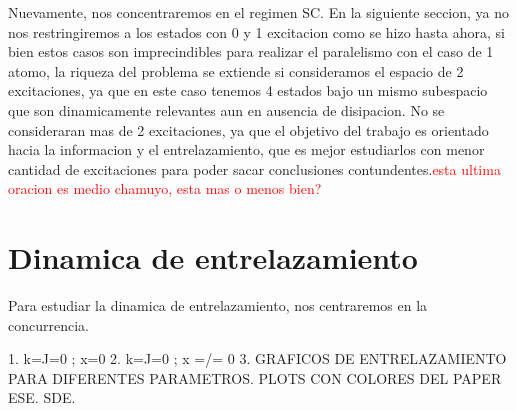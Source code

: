Nuevamente, nos concentraremos en el regimen SC. En la siguiente seccion, ya no nos restringiremos a los estados con 0 y 1 excitacion como se hizo hasta ahora, si bien estos casos son imprecindibles para realizar el paralelismo con el caso de 1 atomo, la riqueza del problema se extiende si consideramos el espacio de 2 excitaciones, ya que en este caso tenemos 4 estados bajo un mismo subespacio que son dinamicamente relevantes aun en ausencia de disipacion. No se consideraran mas de 2 excitaciones, ya que el objetivo del trabajo es orientado hacia la informacion y el entrelazamiento, que es mejor estudiarlos con menor cantidad de excitaciones para poder sacar conclusiones contundentes.\textcolor{red}{esta ultima oracion es medio chamuyo, esta mas o menos bien?} 
\section{Dinamica de entrelazamiento}
Para estudiar la dinamica de entrelazamiento, nos centraremos en la concurrencia. 

1. k=J=0 ; x=0
2. k=J=0 ; x =/= 0
3. 
GRAFICOS DE ENTRELAZAMIENTO PARA DIFERENTES PARAMETROS. PLOTS CON COLORES DEL PAPER ESE. SDE. 